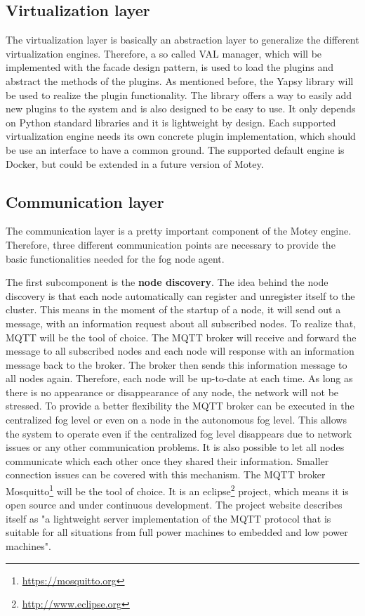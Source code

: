 \subsection{Virtualization layer}
The virtualization layer is basically an abstraction layer to generalize the different virtualization engines.
Therefore, a so called \ac{VAL} manager, which will be implemented with the facade design pattern, is used to load the plugins and abstract the methods of the plugins.
As mentioned before, the Yapsy library will be used to realize the plugin functionality.
The library offers a way to easily add new plugins to the system and is also designed to be easy to use.
It only depends on Python standard libraries and it is lightweight by design.
Each supported virtualization engine needs its own concrete plugin implementation, which should be use an interface to have a common ground.
The supported default engine is Docker, but could be extended in a future version of Motey.


\subsection{Communication layer}
\label{subsection:CommunicationLayer}
The communication layer is a pretty important component of the Motey engine.
Therefore, three different communication points are necessary to provide the basic functionalities needed for the fog node agent.

The first subcomponent is the \textbf{node discovery}.
The idea behind the node discovery is that each node automatically can register and unregister itself to the cluster.
This means in the moment of the startup of a node, it will send out a message, with an information request about all subscribed nodes.
To realize that, \ac{MQTT} will be the tool of choice.
The \ac{MQTT} broker will receive and forward the message to all subscribed nodes and each node will response with an information message back to the broker.
The broker then sends this information message to all nodes again.
Therefore, each node will be up-to-date at each time.
As long as there is no appearance or disappearance of any node, the network will not be stressed.
To provide a better flexibility the \ac{MQTT} broker can be executed in the centralized fog level or even on a node in the autonomous fog level.
This allows the system to operate even if the centralized fog level disappears due to network issues or any other communication problems.
It is also possible to let all nodes communicate which each other once they shared their information.
Smaller connection issues can be covered with this mechanism.
The \ac{MQTT} broker Mosquitto\footnote{\url{https://mosquitto.org}} will be the tool of choice.
It is an eclipse\footnote{\url{http://www.eclipse.org}} project, which means it is open source and under continuous development.
The project website describes itself as "a lightweight server implementation of the MQTT protocol that is suitable for all situations from full power machines to embedded and low power machines"\autocite{Eclipse:Mosquitto}.

